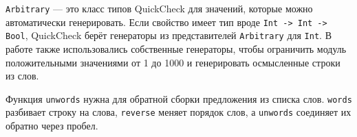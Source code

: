 \texttt{Arbitrary} --- это класс типов QuickCheck для значений, которые можно автоматически генерировать. Если свойство имеет тип вроде \texttt{Int -> Int -> Bool}, QuickCheck берёт генераторы из представителей \texttt{Arbitrary} для \texttt{Int}. В работе также использовались собственные генераторы, чтобы ограничить модуль положительными значениями от 1 до 1000 и генерировать осмысленные строки из слов.

Функция \texttt{unwords} нужна для обратной сборки предложения из списка слов. \texttt{words} разбивает строку на слова, \texttt{reverse} меняет порядок слов, а \texttt{unwords} соединяет их обратно через пробел.

\newpage
